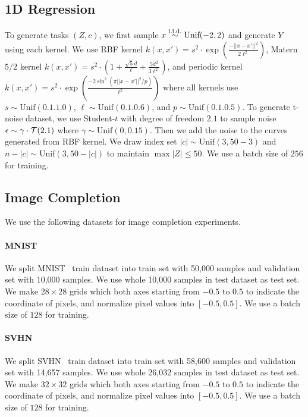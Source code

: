 \subsection{1D Regression}
To generate tasks $(Z, c)$, we first sample $x \overset{\mathrm{i.i.d.}}{\sim} \text{Unif}(-2, 2)$ and generate $Y$ using each kernel. We use RBF kernel $k(x, x') = s^2 \cdot \exp\left(\frac{-|| x - x' ||^2}{2\ell^2}\right)$, Matern $5/2$ kernel $k(x, x') = s^2 \cdot \left( 1 + \frac{\sqrt{5}d}{\ell} + \frac{5d^2}{3\ell^2} \right)$, and periodic kernel $k(x, x') = s^2 \cdot \exp\left( \frac{-2 \sin^2 (\pi||x-x'||^2 / p)}{\ell^2} \right)$ where all kernels use $s \sim \text{Unif}(0.1. 1.0)$, $\ell \sim \text{Unif}(0.1. 0.6)$, and $p \sim \text{Unif}(0.1. 0.5)$. To generate t-noise dataset, we use Student-$t$ with degree of freedom $2.1$ to sample noise $\epsilon \sim \gamma \cdot {\mathcal{T}}(2.1)$ where $\gamma \sim \text{Unif}(0, 0.15)$. Then we add the noise to the curves generated from RBF kernel. We draw index set $|c| \sim \text{Unif}(3, 50 - 3)$ and $n - |c| \sim \text{Unif}(3, 50 - |c|)$ to maintain $\max |Z| \leq 50$. We use a batch size of $256$ for training.

\subsection{Image Completion}

We use the following datasets for image completion experiments.

\paragraph{MNIST}
We split MNIST~\citep{lecun1998gradient} train dataset into train set with 50,000 samples and validation set with 10,000 samples. We use whole 10,000 samples in test dataset as test set. We make $28 \times 28$ grids which both axes starting from $-0.5$ to $0.5$ to indicate the coordinate of pixels, and normalize pixel values into $[-0.5, 0.5]$. We use a batch size of $128$ for training.

\paragraph{SVHN}
We split SVHN~\citep{netzer2011reading} train dataset into train set with 58,600 samples and validation set with 14,657 samples. We use whole 26,032 samples in test dataset as test set. We make $32 \times 32$ grids which both axes starting from $-0.5$ to $0.5$ to indicate the coordinate of pixels, and normalize pixel values into $[-0.5, 0.5]$. We use a batch size of $128$ for training.

